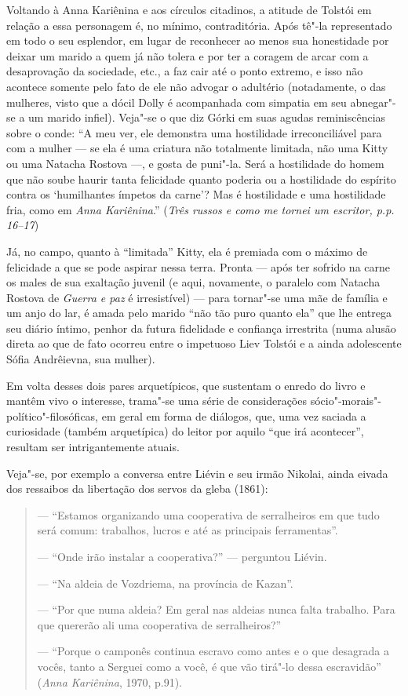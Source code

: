 Voltando à Anna Kariênina e aos círculos citadinos, a atitude de
Tolstói em relação a essa personagem é, no mínimo, contraditória. Após
tê"-la representado em todo o seu esplendor, em lugar de reconhecer ao
menos sua honestidade por deixar um marido a quem já não tolera e
por ter a coragem de arcar com a desaprovação da sociedade, etc., a faz
cair até o ponto extremo, e isso não acontece somente pelo fato de ele
não advogar o adultério (notadamente, o das mulheres, visto que a dócil
Dolly é acompanhada com simpatia em seu abnegar"-se a um marido infiel).
Veja"-se o que diz Górki em suas agudas reminiscências sobre o conde: ``A meu ver, ele demonstra uma hostilidade irreconciliável para com a
mulher --- se ela é uma criatura não totalmente limitada, não uma Kitty
ou uma Natacha Rostova ---, e gosta de puni"-la. Será a hostilidade do
homem que não soube haurir tanta felicidade quanto poderia ou a
hostilidade do espírito contra os `humilhantes ímpetos da carne'? Mas é
hostilidade e uma hostilidade fria, como em \emph{Anna Kariênina}.''
(\emph{Três russos e como me tornei um escritor, p.p. 16--17})

Já, no campo, quanto à ``limitada'' Kitty, ela é premiada com o
máximo de felicidade a que se pode aspirar nessa terra. Pronta ---
após ter sofrido na carne os males de sua exaltação juvenil (e aqui,
novamente, o paralelo com Natacha Rostova de \emph{Guerra e paz} é
irresistível) --- para tornar"-se uma mãe de família e um anjo do lar, é
amada pelo marido ``não tão puro quanto ela'' que lhe entrega seu diário
íntimo, penhor da futura fidelidade e confiança irrestrita (numa alusão
direta ao que de fato ocorreu entre o impetuoso Liev Tolstói e a ainda
adolescente Sófia Andrêievna, sua mulher).

Em volta desses dois pares arquetípicos, que sustentam o enredo do
livro e mantêm vivo o interesse, trama"-se uma série de considerações
sócio"-morais"-político"-filosóficas, em geral em forma de diálogos, que,
uma vez saciada a curiosidade (também arquetípica) do leitor por aquilo
``que irá acontecer'', resultam ser intrigantemente atuais.

Veja"-se, por exemplo a conversa entre Liévin e seu irmão Nikolai, ainda
eivada dos ressaibos da libertação dos servos da gleba (1861):

\begin{quote}
--- ``Estamos organizando uma cooperativa de serralheiros em que tudo será
comum: trabalhos, lucros e até as principais ferramentas''.

\noindent --- ``Onde irão instalar a cooperativa?'' --- perguntou Liévin.

\noindent --- ``Na aldeia de Vozdriema, na província de Kazan''.

\noindent --- ``Por que numa aldeia? Em geral nas aldeias nunca falta trabalho. Para
que quererão ali uma cooperativa de serralheiros?''

\noindent --- ``Porque o camponês continua escravo como antes e o que desagrada a
vocês, tanto a Serguei como a você, é que vão tirá"-lo dessa escravidão''
(\emph{Anna Kariênina}, 1970, p.91).
\end{quote}

